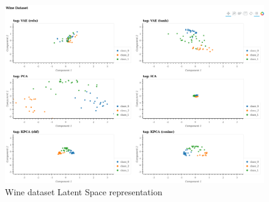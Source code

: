 \documentclass[12pt]{article}
\begin{document}
\begin{figure}[!htb]
    \includegraphics[scale=0.3]{../../media/02-wine-latent.png}
    \caption{Wine dataset Latent Space representation}
    \label{fig:benchwinelatent}
\end{figure}
\end{document}
